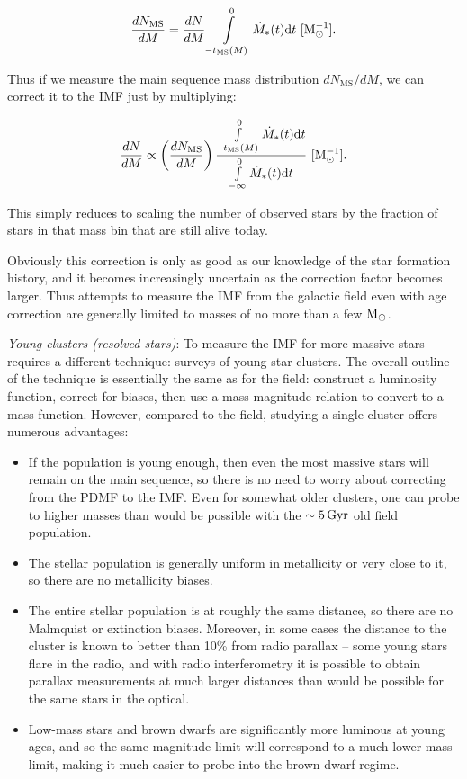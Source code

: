 \documentclass[a4paper,10pt]{article}
\begin{document}
\begin{align*}
    \frac{dN_\mathrm{MS}}{dM} = \frac{dN}{dM} \int\limits_{-t_\mathrm{MS}(M)}^0 \dot{M}_*(t){\rm d}t ~ [{\rm M_\odot^{-1}}].
\end{align*}

{\noindent}Thus if we measure the main sequence mass distribution $dN_\mathrm{MS}/dM$, we can correct it to the IMF just by multiplying:

\begin{align*}
    \frac{dN}{dM} \propto \left(\frac{dN_\mathrm{MS}}{dM}\right) \frac{\int\limits_{-t_\mathrm{MS}(M)}^0 \dot{M}_*(t){\rm d}t}{\int\limits_{-\infty}^0 \dot{M}_*(t){\rm d}t} ~ [{\rm M_\odot^{-1}}].
\end{align*}

{\noindent}This simply reduces to scaling the number of observed stars by the fraction of stars in that mass bin that are still alive today.

{\noindent}Obviously this correction is only as good as our knowledge of the star formation history, and it becomes increasingly uncertain as the correction factor becomes larger. Thus attempts to measure the IMF from the galactic field even with age correction are generally limited to masses of no more than a few ${\rm M_\odot}$.

{\noindent}\textit{Young clusters (resolved stars)}: To measure the IMF for more massive stars requires a different technique: surveys of young star clusters. The overall outline of the technique is essentially the same as for the field: construct a luminosity function, correct for biases, then use a mass-magnitude relation to convert to a mass function. However, compared to the field, studying a single cluster offers numerous advantages:

\begin{itemize}
    \item If the population is young enough, then even the most massive stars will remain on the main sequence, so there is no need to worry about correcting from the PDMF to the IMF. Even for somewhat older clusters, one can probe to higher masses than would be possible with the $\sim5\,{\rm Gyr}$ old field population.
    \item The stellar population is generally uniform in metallicity or very close to it, so there are no metallicity biases.
    \item The entire stellar population is at roughly the same distance, so there are no Malmquist or extinction biases. Moreover, in some cases the distance to the cluster is known to better than 10\% from radio parallax -- some young stars flare in the radio, and with radio interferometry it is possible to obtain parallax measurements at much larger distances than would be possible for the same stars in the optical.
    \item Low-mass stars and brown dwarfs are significantly more luminous at young ages, and so the same magnitude limit will correspond to a much lower mass limit, making it much easier to probe into the brown dwarf regime.
\end{itemize}
\end{document}
